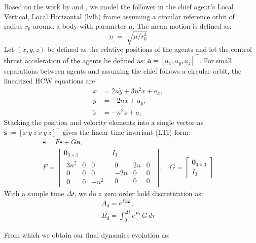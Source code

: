 Based on the work by \cite{clohessy1960terminal} and \cite{hill1878researches}, we model the follower in the chief agent's Local Vertical, Local Horizontal (\acs{lvlh}) frame assuming a circular reference orbit of radius $r_0$ around a body with parameter $\mu$. The mean motion is defined as:
\[
n \;=\; \sqrt{\mu / r_0^3}
\]
Let $(x,y,z)$ be defined as the relative positions of the agents and let the control thrust acceleration of the agents be defined as:
$\mathbf{a} = [a_x, a_y, a_z]^\top$.
For small separations between agents and assuming the chief follows a circular orbit, the linearized HCW equations are
\begin{align*}
\ddot{x} &= 2n \dot{y} + 3n^2 x  + a_x, \\
\ddot{y} &= - 2n \dot{x}            + a_y, \\
\ddot{z} &= - n^2 z                  + a_z
\end{align*}
Stacking the position and velocity elements into a single vector as 
$\mathbf{s} := [x\ y\ z\ \dot{x}\ \dot{y}\ \dot{z}]^\top$
gives the linear time invariant (LTI) form:
\begin{gather*}
\dot{\mathbf{s}} = F\mathbf{s} + G\mathbf{a},\\[4pt]
F =
\begin{bmatrix}
\mathbf{0}_{3\times3} & I_3\\[4pt]
\begin{array}{ccc}
3n^2 & 0   & 0\\
0    & 0   & 0\\
0    & 0   & -n^2
\end{array} &
\begin{array}{ccc}
0 & 2n & 0\\
-2n & 0 & 0\\
0 & 0 & 0
\end{array}
\end{bmatrix},
\quad
G =
\begin{bmatrix}
\mathbf{0}_{3\times3}\\[2pt]
I_3
\end{bmatrix}
\end{gather*}
With a sample time $\Delta t$, we do a zero order hold discretization as:
\begin{gather*}
A_d = e^{F\Delta t},\\[4pt]
B_d = \int_{0}^{\Delta t} e^{F\tau}\,G\,d\tau
\end{gather*}

From which we obtain our final dynamics evolution as:


